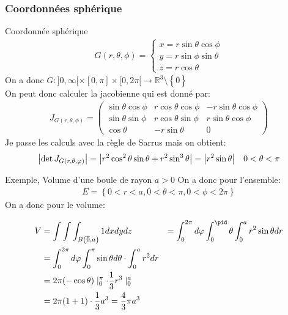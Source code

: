 \subsubsection{Coordonnées sphérique}
\begin{parag}{Coordonnée sphérique}
    \begin{align*} 
        G \left( r, \theta, \phi\right) = \begin{cases} x =  r \sin\theta \cos\phi\\ y =  r\sin\phi \sin \theta\\ z = r\cos\theta\end{cases}
    \end{align*}
    On a  donc $G:  ] 0, \infty [ \times [ 0, \pi ] \times [ 0, 2\pi [ \to \mathbb{R}^{3}\setminus \left\{\overline{0}\right\} $\\
    On peut donc calculer la jacobienne qui est donné par:
    \begin{align*} 
        J_{G\left(r, \theta, \phi\right)} = \begin{pmatrix} \sin \theta\cos\phi & r\cos\theta\cos\phi & -r\sin\theta\cos\phi \\ \sin\theta\sin\phi & r\cos\theta\sin\phi & r\sin\theta\cos\phi \\ \cos\theta & -r\sin\theta & 0 \end{pmatrix} 
    \end{align*}
    Je passe les calculs avec la règle de Sarrus mais  on obtient:
    \begin{align*} 
        \left|\det J_{G\left(r, \theta, \phi\right)}\right| =  \left|r^2\cos^2\theta\sin\theta + r^2\sin^3\theta\right| =  \left|r^2\sin\theta\right| \mathspace 0 < \theta < \pi
    \end{align*}

\end{parag}


\begin{parag}{Exemple, Volume d'une boule de rayon $a > 0$}
    On a donc pour l'ensemble:
    \begin{align*} 
        E =  \left\{0 < r < a, 0 < \theta < \pi, 0 < \phi < 2\pi\right\}
    \end{align*}
    On a donc pour le volume:

    \begin{align*} 
        V &=  \int\int\int_{B\left(\overline{0}, a\right)} 1 dxdydz &= \int_0^{2\pi}d\phi\int_0^\pid\theta\int_0^a r^2\sin\theta dr\\
          &= \int_0^{2\pi}d\phi\int_0^\pi\sin\theta d\theta \cdot  \int_0^a r^2 dr\\
          &= 2\pi\left(-\cos\theta\right)\mid_0^\pi \cdot  \frac{1}{3}r^3 \mid_0^a \\
          &= 2\pi\left(1 + 1\right) \cdot  \frac{1}{3}a^3 =  \frac{4}{3}\pi a^3 
    \end{align*}
\end{parag}


